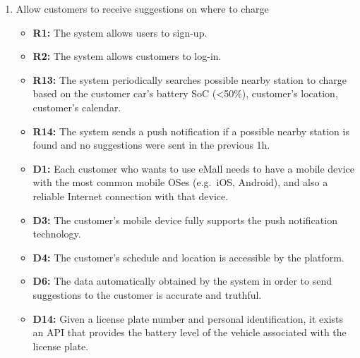 \begin{enumerate}[label=\textbf{-G\arabic*}:]
          \item {Allow customers to receive suggestions on where to charge
          \begin{itemize}
            \item \textbf{R1:} The system allows users to sign-up.
            \item \textbf{R2:} The system allows customers to log-in.
            \item \textbf{R13:} The system periodically searches possible nearby station to charge based on the customer car's battery SoC (<50\%), customer's location, customer's calendar.
            \item \textbf{R14:} The system sends a push notification if a possible nearby station is found and no suggestions were sent in the previous 1h.
            \item \textbf{D1:} Each customer who wants to use eMall needs to have a mobile device with the most common mobile OSes (e.g.\ iOS, Android), and also a reliable Internet connection with that device.
            \item \textbf{D3:} The customer's mobile device fully supports the push notification technology.
            \item \textbf{D4:} The customer's schedule and location is accessible by the platform.
            \item \textbf{D6:} The data automatically obtained by the system in order to send suggestions to the customer is accurate and truthful.
            \item \textbf{D14:} Given a license plate number and personal identification, it exists an API that provides the battery level of the vehicle associated with the license plate.
              
          \end{itemize}
          }



\end{enumerate}
